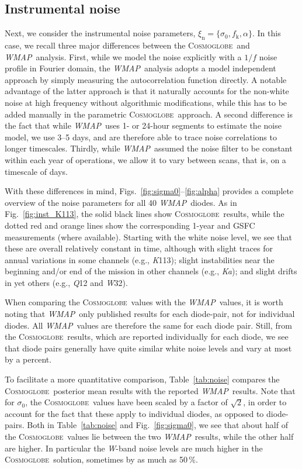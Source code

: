\documentclass[twocolumn]{../../common/aa}
\def\WMAP{\emph{WMAP}}
\newcommand{\cosmoglobe}{\textsc{Cosmoglobe}}
\newcommand{\K}[0]{\textit K}
\newcommand{\Ka}[0]{\textit{Ka}}
\newcommand{\Q}[0]{\textit Q}
\newcommand{\W}[0]{\textit W}
\begin{document}
\subsection{Instrumental noise}
\label{sec:noise}

Next, we consider the instrumental noise parameters, $\xi_\mathrm{n}=\{\sigma_0, f_{\mathrm{k}}, \alpha\}$. In this case, we recall three major differences between the \cosmoglobe\ and \WMAP\ analysis. First, while we model the noise explicitly with a $1/f$ noise profile in Fourier domain, the \WMAP\ analysis adopts a model independent approach by simply measuring the autocorrelation function directly. A notable advantage of the latter approach is that it naturally accounts for the non-white noise at high frequency without algorithmic modifications, while this has to be added manually in the parametric \cosmoglobe\ approach. A second difference is the fact that while \WMAP\ uses 1- or 24-hour segments to estimate the noise model, we use 3--5 days, and are therefore able to trace noise correlations to longer timescales. Thirdly, while \WMAP\ assumed the noise filter to be constant within each year of operations, we allow it to vary between scans, that is, on a timescale of days.

With these differences in mind, Figs.~\ref{fig:sigma0}--\ref{fig:alpha} provides a complete overview of the noise parameters for all 40 \WMAP\ diodes. As in Fig.~\ref{fig:inst_K113}, the solid black lines show \cosmoglobe\ results, while the dotted red and orange lines show the corresponding 1-year and GSFC measurements (where available). Starting with the white noise level, we see that these are overall relatively constant in time, although with slight traces for annual variations in some channels (e.g., \K113); slight instabilities near the beginning and/or end of the mission in other channels (e.g., \Ka); and slight drifts in yet others (e.g., \Q12 and \W32).

When comparing the \cosmoglobe\ values with the \WMAP\ values, it is worth noting that \WMAP\ only published results for each diode-pair, not for individual diodes. All \WMAP\ values are therefore the same for each diode pair. Still, from the \cosmoglobe\ results, which are reported individually for each diode, we see that diode pairs generally have quite similar white noise levels and vary at most by a percent.

To facilitate a more quantitative comparison, Table~\ref{tab:noise} compares the \cosmoglobe\ posterior mean results with the reported \WMAP\ results. Note that for $\sigma_0$, the \cosmoglobe\ values have been scaled by a factor of $\sqrt{2}$, in order to account for the fact that these apply to individual diodes, as opposed to diode-pairs. Both in Table~\ref{tab:noise} and Fig.~\ref{fig:sigma0}, we see that about half of the \cosmoglobe\ values lie between the two \WMAP\ results, while the other half are higher. In particular the \W-band noise levels are much higher in the \cosmoglobe\ solution, sometimes by as much as 50\,\%.
\end{document}

